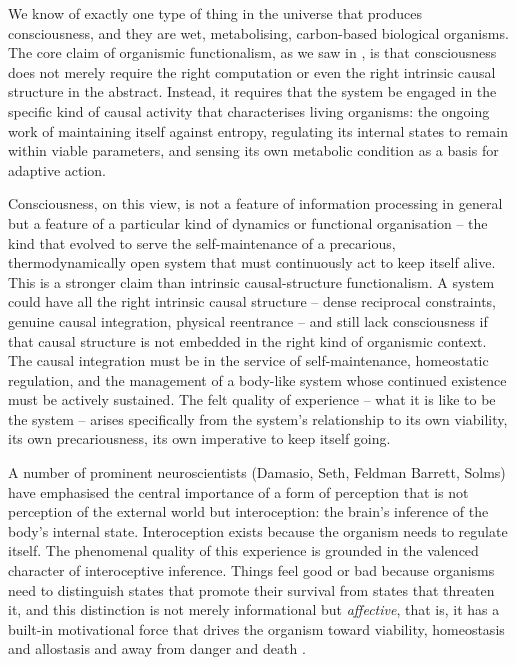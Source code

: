 \documentclass[11pt, a4paper, onecolumn, gdm]{google}
\begin{document}
We know of exactly one type of thing in the universe that produces consciousness, and they are wet, metabolising, carbon-based biological organisms.
The core claim of organismic functionalism, as we saw in , is that consciousness does not merely require the right computation or even the right intrinsic causal structure in the abstract.
Instead, it requires that the system be engaged in the specific kind of causal activity that characterises living organisms: the ongoing work of maintaining itself against entropy, regulating its internal states to remain within viable parameters, and sensing its own metabolic condition as a basis for adaptive action.

Consciousness, on this view, is not a feature of information processing in general but a feature of a particular kind of dynamics or functional organisation -- the kind that evolved to serve the self-maintenance of a precarious, thermodynamically open system that must continuously act to keep itself alive.
This is a stronger claim than intrinsic causal-structure functionalism.
A system could have all the right intrinsic causal structure -- dense reciprocal constraints, genuine causal integration, physical reentrance -- and still lack consciousness if that causal structure is not embedded in the right kind of organismic context.
The causal integration must be in the service of self-maintenance, homeostatic regulation, and the management of a body-like system whose continued existence must be actively sustained.
The felt quality of experience -- what it is like to be the system -- arises specifically from the system's relationship to its own viability, its own precariousness, its own imperative to keep itself going.

A number of prominent neuroscientists (Damasio, Seth, Feldman Barrett, Solms) have emphasised the central importance of a form of perception that is not perception of the external world but interoception: the brain's inference of the body's internal state.
Interoception exists because the organism needs to regulate itself.
The phenomenal quality of this experience is grounded in the valenced character of interoceptive inference.
Things feel good or bad because organisms need to distinguish states that promote their survival from states that threaten it, and this distinction is not merely informational but \emph{affective}, that is, it has a built-in motivational force that drives the organism toward viability, homeostasis and allostasis and away from danger and death \citep{seth2018,solms2021}.
\end{document}
